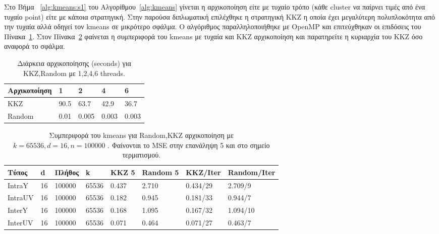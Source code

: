 \newpage

\indent Στο Βήμα ~\ref{alg:kmeans:s1} του Αλγορίθμου~\ref{alg:kmeans} γίνεται η αρχικοποίηση είτε με τυχαίο τρόπο
(κάθε cluster να παίρνει τιμές από ένα τυχαίο point) είτε με κάποια στρατηγική. Στην παρούσα διπλωματική επιλέχθηκε
η στρατηγική KKZ \cite{kkz} η οποία έχει μεγαλύτερη πολυπλοκότητα από την τυχαία αλλά οδηγεί τον kmeans
σε μικρότερο σφάλμα. Ο αλγόριθμος παραλληλοποιήθηκε με OpenMP και επιτεύχθηκαν οι επιδόσεις του Πίνακα~\ref{table:kkzspeed}.
Στον Πίνακα~\ref{table:kkziter} φαίνεται η συμπεριφορά του kmeans με τυχαία και KKZ αρχικοποίηση και παρατηρείτε η κυριαρχία
του KKZ όσο αναφορά το σφάλμα.

\begin{table}[h!]
    \begin{center}
        \begin{tabular}{| l | l | l | l | l |}
        \hline
        Αρχικοποίηση   & 1     & 2      & 4     & 6    \\ \hline
        KKZ     & 90.5 & 63.7   & 42.9  & 36.7  \\ \hline
        Random  & 0.01  & 0.005  & 0.003 & 0.003    \\ \hline
        \hline
        \end{tabular}
    \end{center}
    \caption{Διάρκεια αρχικοποίησης (seconds) για KKZ,Random με 1,2,4,6 threads.}
    \label{table:kkzspeed}
\end{table}

\begin{table}[h!]
    \begin{center}
        \begin{tabular}{| l | l | l | l | l | l | l | l |}
        \hline
        Τύπος    & d  & Πλήθος & k     & KKZ 5  & Random 5 & KKZ/Iter   & Random/Iter   \\ \hline
        IntraY   & 16 & 100000 & 65536 & 0.437  & 2.710    &  0.434/29  & 2.709/9                 \\ \hline
        IntraUV  & 16 & 100000 & 65536 & 0.182  & 0.945    &  0.181/33  & 0.944/7                 \\ \hline
        InterY   & 16 & 100000 & 65536 & 0.168  & 1.095    &  0.167/32  & 1.094/10                \\ \hline
        InterUV  & 16 & 100000 & 65536 & 0.071  & 0.464    &  0.071/27  & 0.463/7                 \\ \hline
        \hline
        \end{tabular}
    \end{center}
    \caption{Συμπεριφορά του kmeans για Random,KKZ αρχικοποίηση με $k=65536,d=16,n=100000$
    . Φαίνονται το MSE στην επανάληψη 5 και στο σημείο τερματισμού.}
    \label{table:kkziter}
\end{table}

